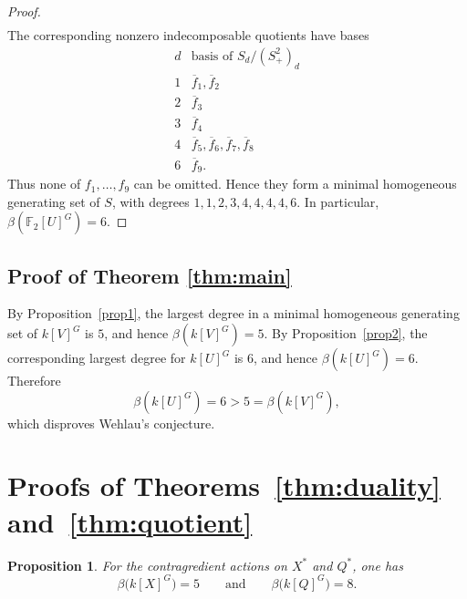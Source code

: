 \documentclass[11pt]{article}
\newtheorem{proposition}[theorem]{Proposition}
\theoremstyle{definition}
\begin{document}
\begin{proof}
\[\begin{array}{c|rrrrrrr}
			\end{array}
			\]
			The corresponding nonzero indecomposable quotients have bases
			\[
			\begin{array}{c|c}
				d&
				\text{basis of }S_{d}/(S_{+}^{2})_{d}\\ \hline
				1&\overline f_{1},\overline f_{2}\\
				2&\overline f_{3}\\
				3&\overline f_{4}\\
				4&\overline f_{5},\overline f_{6},
				\overline f_{7},\overline f_{8}\\
				6&\overline f_{9}.
			\end{array}
			\]
			Thus none of \(f_{1},\ldots,f_{9}\) can be omitted. Hence they form a minimal homogeneous generating set of \(S\), with degrees $1,1,2,3,4,4,4,4,6$. In particular, $\beta\!\left(\mathbb F_{2}[U]^{G}\right)=6$.
		
	\end{proof}
	
	\subsection*{Proof of Theorem \ref{thm:main}}
	By Proposition~\ref{prop1}, the largest degree in a minimal homogeneous generating set of $k[V]^G$ is $5$, and hence $\beta(k[V]^G)=5$. By Proposition~\ref{prop2}, the corresponding largest degree for $k[U]^G$ is $6$, and hence $\beta(k[U]^G)=6$. Therefore
	\[
	\beta(k[U]^G)=6>5=\beta(k[V]^G),
	\]
	which disproves Wehlau's conjecture.
	
	
	\section{Proofs of Theorems~\ref{thm:duality} and~\ref{thm:quotient}}
	\label{sec:duality-quotients}

	\begin{proposition}\label{prop:dual-values}
		For the contragredient actions on $X^*$ and $Q^*$, one has
		\[
		\beta\bigl(k[X]^G\bigr)=5
		\qquad\text{and}\qquad
		\beta\bigl(k[Q]^G\bigr)=8.
		\]
	\end{proposition}
\end{document}
